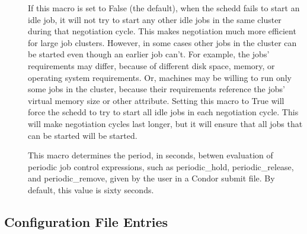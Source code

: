 \begin{description}
\item[]
  \label{param:NegotiateAllJobsInCluster}
  If this macro is set to False (the default), when the schedd fails
  to start an idle job, it will not try to start any other
  idle jobs in the same cluster during that negotiation cycle.  This
  makes negotiation much more efficient for large job clusters.
  However, in some cases other jobs in the cluster can be started even
  though an earlier job can't.  For example, the jobs' requirements
  may differ, because of different disk space, memory, or
  operating system requirements.  Or, machines may be willing to run
  only some jobs in the cluster, because their requirements reference
  the jobs' virtual memory size or other attribute.  Setting this
  macro to True will force the schedd to try to start all idle jobs in
  each negotiation cycle.  This will make negotiation cycles last
  longer, but it will ensure that all jobs that can be started will be
  started.

\item[]
  \label{param:PeriodicExprInterval}
  This macro determines the period, in seconds, betwen evaluation
  of periodic job control expressions, such as periodic\_hold,
  periodic\_release, and periodic\_remove, given by the user in
  a Condor submit file. By default, this value is sixty seconds.
\end{description}

\subsection{\label{sec:Shadow-Config-File-Entries}
 Configuration File Entries}

